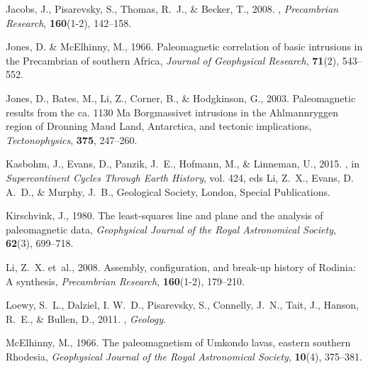 \documentclass[11pt,letterpaper]{article}
\begin{document}
\begin{thebibliography}{49}
Jacobs, J., Pisarevsky, S., Thomas, R.~J., \& Becker, T., 2008.
,
  {\it Precambrian Research\/}, {\bf 160}(1-2), 142--158.

Jones, D. \& McElhinny, M., 1966.
\newblock Paleomagnetic correlation of basic intrusions in the {P}recambrian of
  southern {A}frica, {\it Journal of Geophysical Research\/}, {\bf 71}(2),
  543--552.

Jones, D., Bates, M., Li, Z., Corner, B., \& Hodgkinson, G., 2003.
\newblock Paleomagnetic results from the ca. 1130 {M}a {B}orgmassivet
  intrusions in the {A}hlmannryggen region of {D}ronning {M}aud {L}and,
  {A}ntarctica, and tectonic implications, {\it Tectonophysics\/}, {\bf 375},
  247--260.

Kasbohm, J., Evans, D., Panzik, J.~E., Hofmann, M., \& Linneman, U., 2015.
, in {\em
  Supercontinent Cycles Through Earth History\/}, vol. 424, eds Li, Z.~X.,
  Evans, D. A.~D., \& Murphy, J.~B., Geological Society, London, Special
  Publications.

Kirschvink, J., 1980.
\newblock The least-squares line and plane and the analysis of paleomagnetic
  data, {\it Geophysical Journal of the Royal Astronomical Society\/}, {\bf
  62}(3), 699--718.

Li, Z.~X. et~al., 2008.
\newblock Assembly, configuration, and break-up history of {R}odinia: A
  synthesis, {\it Precambrian Research\/}, {\bf 160}(1-2), 179--210.

Loewy, S.~L., Dalziel, I. W.~D., Pisarevsky, S., Connelly, J.~N., Tait, J.,
  Hanson, R.~E., \& Bullen, D., 2011.
, {\it Geology\/}.

Mc{E}lhinny, M., 1966.
\newblock The paleomagnetism of {U}mkondo lavas, eastern southern {R}hodesia,
  {\it Geophysical Journal of the Royal Astronomical Society\/}, {\bf 10}(4),
  375--381.


\end{thebibliography}
\end{document}
